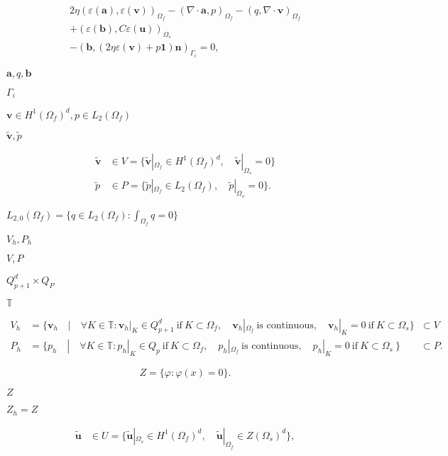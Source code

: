 \documentclass{article}
\begin{document}
\begin{multline*} 2 \eta (\varepsilon(\mathbf a), \varepsilon(\mathbf v))_{\Omega_f} - (\nabla \cdot \mathbf a, p)_{\Omega_f} - (q, \nabla \cdot \mathbf v)_{\Omega_f} \\ + (\varepsilon(\mathbf b), C \varepsilon(\mathbf u))_{\Omega_s} \\ - (\mathbf b, (2 \eta \varepsilon(\mathbf v) + p \mathbf 1) \mathbf n)_{\Gamma_i} = 0, \end{multline*}
\pagebreak

$\mathbf a, q, \mathbf b$
\pagebreak

$\Gamma_i$
\pagebreak

$\mathbf v \in H^1(\Omega_f)^d, p \in L_2(\Omega_f)$
\pagebreak

$\tilde{\mathbf v}, \tilde p$
\pagebreak

\begin{align*} \tilde {\mathbf v} &\in V = \{\tilde {\mathbf v}|_{\Omega_f} \in H^1(\Omega_f)^d, \quad \tilde {\mathbf v}|_{\Omega_s} = 0 \} \\ \tilde p &\in P = \{\tilde p|_{\Omega_f} \in L_2(\Omega_f), \quad \tilde p|_{\Omega_s} = 0 \}. \end{align*}
\pagebreak

$L_{2,0}(\Omega_f)=\{q\in L_2(\Omega_f): \int_{\Omega_f} q = 0\}$
\pagebreak

$V_h,P_h$
\pagebreak

$V, P$
\pagebreak

$Q_{p+1}^d\times Q_P$
\pagebreak

$\mathbb T$
\pagebreak

\begin{align*} V_h &= \{{\mathbf v}_h \quad | \quad \forall K \in {\mathbb T}: {\mathbf v}_h|_K \in Q_{p+1}^d\ \text{if}\ K\subset {\Omega_f}, \quad {\mathbf v}_h|_{\Omega_f}\ \text{is continuous}, \quad {\mathbf v}_h|_K = 0\ \text{if}\ K\subset {\Omega_s}\} && \subset V \\ P_h &= \{ p_h \quad | \quad \forall K \in {\mathbb T}: p_h|_K \in Q_p\ \text{if}\ K\subset {\Omega_f}, \quad p_h|_{\Omega_f}\ \text{is continuous}, \quad p_h|_K = 0\ \text{if}\ K\subset {\Omega_s}\ \} && \subset P. \end{align*}
\pagebreak

\[ Z = \{ \varphi: \varphi(x)=0 \}. \]
\pagebreak

$Z$
\pagebreak

$Z_h=Z$
\pagebreak

\begin{align*} \tilde {\mathbf u} &\in U = \{\tilde {\mathbf u}|_{\Omega_s} \in H^1(\Omega_f)^d, \quad \tilde {\mathbf u}|_{\Omega_f} \in Z(\Omega_s)^d \}, \end{align*}
\pagebreak
\end{document}
